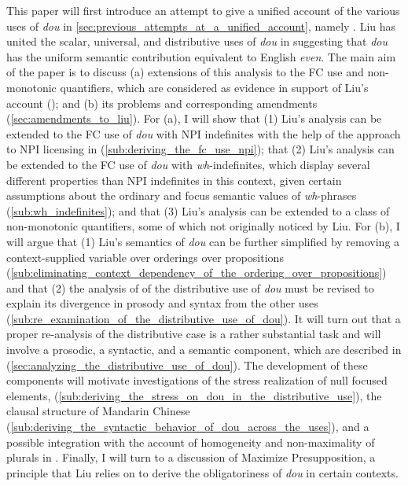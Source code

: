 \documentclass[12pt]{article}
\begin{document}
This paper will first introduce an attempt to give a unified account of the various uses of \emph{dou} in \cref{sec:previous_attempts_at_a_unified_account}, namely \citet{liuVarietiesAlternativesMandarin2017,liuPragmaticExplanationMeidou2021}.
Liu has united the scalar, universal, and distributive uses of \emph{dou} in suggesting that \emph{dou} has the uniform semantic contribution equivalent to English \emph{even}.
The main aim of the paper is to discuss (a) extensions of this analysis to the FC use and non-monotonic quantifiers, which are considered as evidence in support of Liu's account (); and (b) its problems and corresponding amendments (\cref{sec:amendments_to_liu}).
For (a), I will show that (1) Liu's analysis can be extended to the FC use of \emph{dou} with NPI indefinites with the help of the approach to NPI licensing in \citet{lahiriFocusNegativePolarity1998,crnicNonmonotonicityNPILicensing2014} (\cref{sub:deriving_the_fc_use_npi}); that (2) Liu's analysis can be extended to the FC use of \emph{dou} with \emph{wh}-indefinites, which display several different properties than NPI indefinites in this context, given certain assumptions about the ordinary and focus semantic values of \emph{wh}-phrases (\cref{sub:wh_indefinites}); and that (3) Liu's analysis can be extended to a class of non-monotonic quantifiers, some of which not originally noticed by Liu. 
For (b), I will argue that (1) Liu's semantics of \emph{dou} can be further simplified by removing a context-supplied variable over orderings over propositions (\cref{sub:eliminating_context_dependency_of_the_ordering_over_propositions}) and that (2) the analysis of of the distributive use of \emph{dou} must be revised to explain its divergence in prosody and syntax from the other uses (\cref{sub:re_examination_of_the_distributive_use_of_dou}).
It will turn out that a proper re-analysis of the distributive case is a rather substantial task and will involve a prosodic, a syntactic, and a semantic component, which are described in (\cref{sec:analyzing_the_distributive_use_of_dou}).
The development of these components will motivate investigations of the stress realization of null focused elements, (\cref{sub:deriving_the_stress_on_dou_in_the_distributive_use}), the clausal structure of Mandarin Chinese (\cref{sub:deriving_the_syntactic_behavior_of_dou_across_the_uses}), and a possible integration with the account of homogeneity and non-maximality of plurals in \citet{bar-levImplicatureAccountHomogeneity2021}.
Finally, I will turn to a discussion of Maximize Presupposition, a principle that Liu relies on to derive the obligatoriness of \emph{dou} in certain contexts. 
\end{document}
